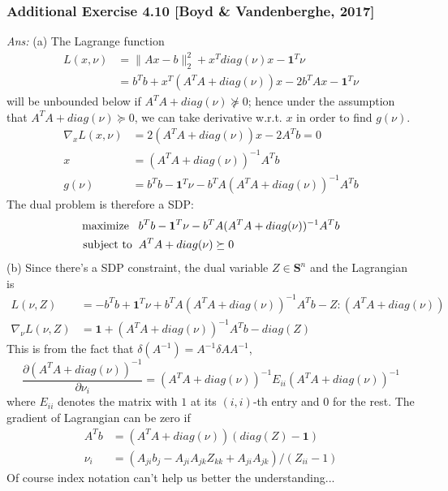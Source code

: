 \documentclass[12pt,a4paper]{article}
\newcommand{\pd}[2]{\frac{\partial{#1}}{\partial{#2}}}
\def\vS{\mathbf{S}}
\begin{document}
\newpage\subsubsection*{Additional Exercise 4.10 [Boyd \& Vandenberghe, 2017]}
{\it Ans:} (a) The Lagrange function 
\begin{align*}
L(x, \nu) &= \|Ax-b\|^2_2 + x^T diag(\nu) x - \mathbf1^T\nu\\
&= b^Tb + x^T(A^TA + diag(\nu))x - 2b^TAx - \mathbf1^T\nu
\end{align*}
will be unbounded below if $A^TA + diag(\nu) \nsucceq 0$; hence under the assumption that $A^TA + diag(\nu) \succeq 0$, we can take derivative w.r.t. $x$ in order to find $g(\nu)$. 
\begin{align*}
\nabla_xL(x, \nu) &= 2(A^TA + diag(\nu))x - 2A^Tb = 0\\
x &= (A^TA + diag(\nu))^{-1}A^Tb\\
g(\nu) &= b^Tb - \mathbf1^T\nu -  b^TA(A^TA+diag(\nu))^{-1}A^Tb
\end{align*}
The dual problem is therefore a SDP:
\begin{align*}
\mbox{maximize\;\;\;} & b^Tb - \mathbf1^T\nu -  b^TA(A^TA+diag(\nu))^{-1}A^Tb \\
\mbox{subject to\;\;} & A^TA + diag(\nu) \succeq 0
\end{align*}
(b) Since there's a SDP constraint, the dual variable $Z \in \vS^n$ and the Lagrangian is 
\begin{align*}
L(\nu, Z) &= -b^Tb + \mathbf1^T\nu +  b^TA(A^TA+diag(\nu))^{-1}A^Tb - Z : (A^TA + diag(\nu)) \\
\nabla_\nu L(\nu, Z) &= \mathbf1 + (A^TA + diag(\nu))^{-1}A^Tb - diag(Z)
\end{align*}
This is from the fact that $\delta (A^{-1}) = A^{-1}\delta A A^{-1}$, 
$$\pd{(A^TA+diag(\nu))^{-1}}{\nu_i} = (A^TA+diag(\nu))^{-1}E_{ii}(A^TA+diag(\nu))^{-1}$$
where $E_{ii}$ denotes the matrix with $1$ at its $(i,i)$-th entry and $0$ for the rest. The gradient of Lagrangian can be zero if 
\begin{align*}
A^Tb &= (A^TA+diag(\nu))(diag(Z) - \mathbf1) \\
\nu_i &= (A_{ji}b_j - A_{ji}A_{jk}Z_{kk} + A_{ji}A_{jk}) / (Z_{ii}-1)
\end{align*}
Of course index notation can't help us better the understanding...
\end{document}
